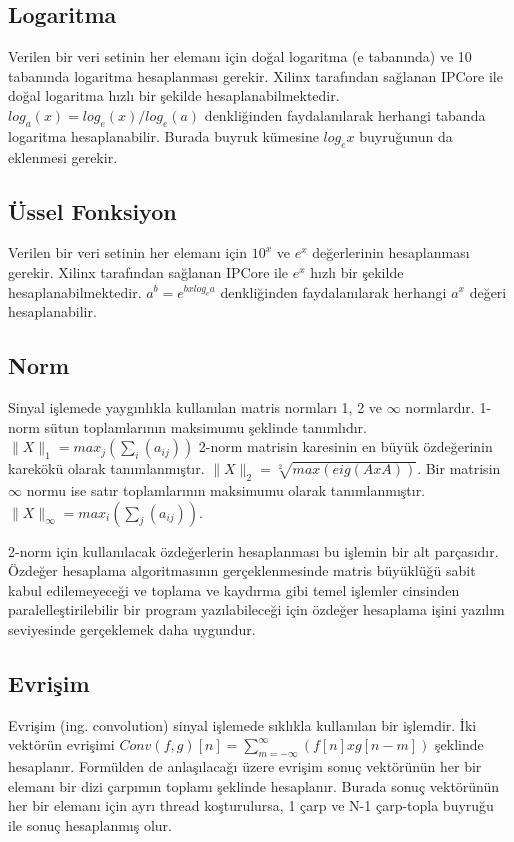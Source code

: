 \subsection{Logaritma}
Verilen bir veri setinin her elemanı için doğal logaritma (e tabanında) ve 10 tabanında logaritma hesaplanması gerekir. Xilinx tarafından sağlanan IPCore ile doğal logaritma hızlı bir şekilde hesaplanabilmektedir. 
$log_{a}(x) = log_{e}(x) / log_{e}(a)$ 
denkliğinden faydalanılarak herhangi tabanda logaritma hesaplanabilir. Burada buyruk kümesine $log_{e}x$ buyruğunun da eklenmesi gerekir.

\subsection{Üssel Fonksiyon}
Verilen bir veri setinin her elemanı için $10^{x}$ ve $e^{x}$ değerlerinin hesaplanması gerekir. Xilinx tarafından sağlanan IPCore ile $e^{x}$ hızlı bir şekilde hesaplanabilmektedir. $a^{b} = e^{b x log_{e}{a}}$ denkliğinden faydalanılarak herhangi $a^{x}$ değeri hesaplanabilir.

\subsection{Norm}
Sinyal işlemede yaygınlıkla kullanılan matris normları 1, 2 ve $\infty$ normlardır. 1-norm sütun toplamlarının maksimumu şeklinde tanımlıdır. 
$\|X\|_{1} = max_{j}(\sum_{i}(a_{ij}))$ 2-norm matrisin karesinin en büyük özdeğerinin karekökü olarak tanımlanmıştır. $\|X\|_{2} = \sqrt[2]{max(eig(AxA))}$. Bir matrisin $\infty$ normu ise satır toplamlarının maksimumu olarak tanımlanmıştır. $\|X\|_{\infty} = max_{i}(\sum_{j}(a_{ij}))$.\cite{smith1997matlab}\par
2-norm için kullanılacak özdeğerlerin hesaplanması bu işlemin bir alt parçasıdır. Özdeğer hesaplama algoritmasının gerçeklenmesinde matris büyüklüğü sabit kabul edilemeyeceği ve toplama ve kaydırma gibi temel işlemler cinsinden paralelleştirilebilir bir program yazılabileceği için özdeğer hesaplama işini yazılım seviyesinde gerçeklemek daha uygundur.\cite{eigenvalueComputation} \par

\subsection{Evrişim}
Evrişim (ing. convolution) sinyal işlemede sıklıkla kullanılan bir işlemdir. İki vektörün evrişimi $Conv(f,g)[n]=\sum_{m=-\infty}^{\infty}(f[n]xg[n-m])$ şeklinde hesaplanır. Formülden de anlaşılacağı üzere evrişim sonuç vektörünün her bir elemanı bir dizi çarpımın toplamı şeklinde hesaplanır. Burada sonuç vektörünün her bir elemanı için ayrı thread koşturulursa, 1 çarp ve N-1 çarp-topla buyruğu ile sonuç hesaplanmış olur. 

